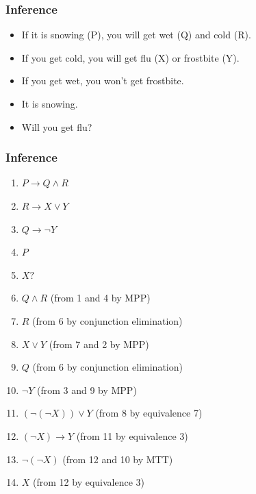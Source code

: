 \documentclass{beamer}
\begin{document}
\begin{frame}

\frametitle{Inference}

\begin{itemize}

\item If it is snowing (P), you will get wet (Q) and cold (R).

\item If you get cold, you will get flu (X) or frostbite (Y).

\item If you get wet, you won't get frostbite.

\item It is snowing.

\item Will you get flu?

\end{itemize}


\end{frame}





\begin{frame}

\frametitle{Inference}

\begin{enumerate}

\item $P \rightarrow Q \wedge R$

\item $R \rightarrow X \vee Y$ 

\item $Q \rightarrow \neg Y$

\item $P$

\item $X?$

\item $Q \wedge R$ (from 1 and 4 by MPP)

\item $R$ (from 6 by conjunction elimination)

\item $X \vee Y$ (from 7 and 2 by MPP)

\item $Q$ (from 6 by conjunction elimination)

\item $\neg Y$ (from 3 and 9 by MPP)

\item $(\neg(\neg X)) \vee Y$ (from 8 by equivalence 7)

\item $(\neg X) \rightarrow Y$ (from 11 by equivalence 3)

\item $\neg(\neg X)$ (from 12 and 10 by MTT)

\item $X$ (from 12 by equivalence 3)

\end{enumerate}

\end{frame}
\end{document}
